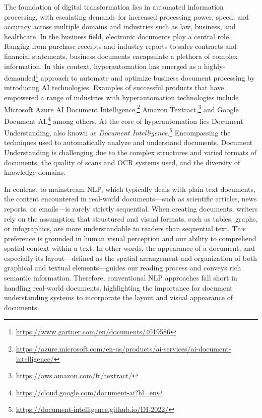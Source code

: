 The foundation of digital transformation lies in automated information processing, with escalating demands for increased processing power, speed, and accuracy across multiple domains and industries such as law, business, and healthcare. In the business field, electronic documents play a central role. Ranging from purchase receipts and industry reports to sales contracts and financial statements, business documents encapsulate a plethora of complex information. In this context, hyperautomation has emerged as a highly-demanded\footnote{\url{https://www.gartner.com/en/documents/4019586}} approach to automate and optimize business document processing by introducing \ac{AI} technologies. Examples of successful products that have empowered a range of industries with hyperautomation technologies include Microsoft Azure AI Document Intelligence,\footnote{\url{https://azure.microsoft.com/en-us/products/ai-services/ai-document-intelligence/}} Amazon Textract,\footnote{\url{https://aws.amazon.com/fr/textract/}} and Google Document AI,\footnote{\url{https://cloud.google.com/document-ai?hl=en}} among others. At the core of hyperautomation lies Document Understanding, also known as \textit{Document Intelligence}.\footnote{\url{https://document-intelligence.github.io/DI-2022/}} Encompassing the techniques used to automatically analyze and understand documents, Document Understanding is challenging due to the complex structures and varied formats of documents, the quality of scans and \ac{OCR} systems used, and the diversity of knowledge domains.

In contrast to mainstream \ac{NLP}, which typically deals with plain text documents, the content encountered in real-world documents—such as scientific articles, news reports, or emails—is rarely strictly sequential. When creating documents, writers rely on the assumption that structured and visual formats, such as tables, graphs, or infographics, are more understandable to readers than sequential text. This preference is grounded in human visual perception and our ability to comprehend spatial context within a text. In other words, the appearance of a document, and especially its layout—defined as the spatial arrangement and organization of both graphical and textual elements—guides our reading process and conveys rich semantic information. Therefore, conventional \ac{NLP} approaches fall short in handling real-world documents, highlighting the importance for document understanding systems to incorporate the layout and visual appearance of documents.

